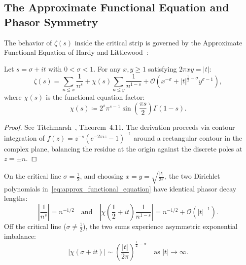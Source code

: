 \subsection{The Approximate Functional Equation and Phasor Symmetry}

The behavior of $\zeta(s)$ inside the critical strip is governed by the Approximate Functional Equation of Hardy and Littlewood~\cite{HardyLittlewood1921}:

\begin{theorem}
\label{thm:approx_functional_equation}
\leanok
Let $s = \sigma + i t$ with $0 < \sigma < 1$. For any $x, y \ge 1$ satisfying $2\pi x y = |t|$:
\begin{equation}
\label{eq:approx_functional_equation}
\zeta(s) = \sum_{n \le x} \frac{1}{n^s} + \chi(s) \sum_{n \le y} \frac{1}{n^{1-s}} + \mathcal{O}\left(x^{-\sigma} + |t|^{\frac{1}{2}-\sigma} y^{\sigma-1}\right),
\end{equation}
where $\chi(s)$ is the functional equation factor:
\begin{equation}
\chi(s) \coloneqq 2^s \pi^{s-1} \sin\left(\frac{\pi s}{2}\right) \Gamma(1-s).
\end{equation}
\end{theorem}

\begin{proof}
\leanok
See Titchmarsh~\cite{Titchmarsh1986}, Theorem~4.11. The derivation proceeds via contour integration of $f(z) = z^{-s} (e^{-2\pi i z} - 1)^{-1}$ around a rectangular contour in the complex plane, balancing the residue at the origin against the discrete poles at $z = \pm n$.
\end{proof}

\begin{corollary}
\label{cor:phasor_symmetry}
\leanok
On the critical line $\sigma = \frac{1}{2}$, and choosing $x = y = \sqrt{\frac{|t|}{2\pi}}$, the two Dirichlet polynomials in~\eqref{eq:approx_functional_equation} have identical phasor decay lengths:
\begin{equation}
\label{eq:critical_phasor_balance}
\left| \frac{1}{n^s} \right| = n^{-1/2} \quad \text{and} \quad \left| \chi\left(\frac{1}{2} + i t\right) \frac{1}{n^{1-s}} \right| = n^{-1/2} + \mathcal{O}\left(|t|^{-1}\right).
\end{equation}
Off the critical line ($\sigma \neq \frac{1}{2}$), the two sums experience asymmetric exponential imbalance:
\begin{equation}
|\chi(\sigma + i t)| \sim \left(\frac{|t|}{2\pi}\right)^{\frac{1}{2} - \sigma} \quad \text{as } |t| \to \infty.
\end{equation}
\end{corollary}

